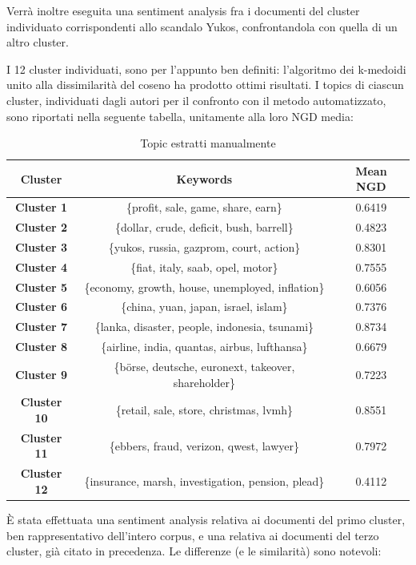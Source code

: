 \documentclass[]{article}
\begin{document}
Verrà inoltre eseguita una sentiment analysis fra i documenti del cluster individuato corrispondenti allo scandalo Yukos, confrontandola con quella di un altro cluster.


I 12 cluster individuati, sono per l'appunto ben definiti: l'algoritmo dei k-medoidi unito alla dissimilarità del coseno ha prodotto ottimi risultati. I topics di ciascun cluster, individuati dagli autori per il confronto con il metodo automatizzato, sono riportati nella seguente tabella, unitamente alla loro NGD media:


\begin{table}[H]
	\begin{center}
		\begin{tabular}{|c|c|c|}
			\hline
			\textbf{Cluster} & \textbf{Keywords} & 	\textbf{Mean NGD} \\
			\hline
			\textbf{Cluster 1} & \{profit, sale, game, share, earn\} & 0.6419  \\ 
			\hline 
			\textbf{Cluster 2} & \{dollar, crude, deficit, bush, barrell\} & 0.4823 \\ 
			\hline 
			\textbf{Cluster 3} & \{yukos, russia, gazprom, court, action\} & 0.8301\\ 
			\hline 
			\textbf{Cluster 4} & \{fiat, italy, saab, opel, motor\} & 0.7555 \\ 
			\hline 
			\textbf{Cluster 5} & \{economy, growth, house, unemployed, inflation\} & 0.6056\\ 
			\hline 
			\textbf{Cluster 6} & \{china, yuan, japan, israel, islam\} & 0.7376 \\ 
			\hline 
			\textbf{Cluster 7} & \{lanka, disaster, people, indonesia, tsunami\} & 0.8734  \\ 
			\hline 
			\textbf{Cluster 8} & \{airline, india, quantas, airbus, lufthansa\} & 0.6679 \\ 
			\hline 
			\textbf{Cluster 9} & \{börse, deutsche, euronext, takeover, shareholder\} & 0.7223  \\ 
			\hline 
			\textbf{Cluster 10} & \{retail, sale, store, christmas, lvmh\} & 0.8551 \\ 
			\hline 
			\textbf{Cluster 11} & \{ebbers, fraud, verizon, qwest, lawyer\} & 0.7972\\ 
			\hline 
			\textbf{Cluster 12} & \{insurance, marsh, investigation, pension, plead\} & 0.4112  \\ 
			\hline 
		\end{tabular} 
		\caption{Topic estratti manualmente}
	\end{center}
\end{table}
È stata effettuata una sentiment analysis relativa ai documenti del primo cluster, ben rappresentativo dell'intero corpus, e una relativa ai documenti del terzo cluster, già citato in precedenza. Le differenze (e le similarità) sono notevoli:
\end{document}
